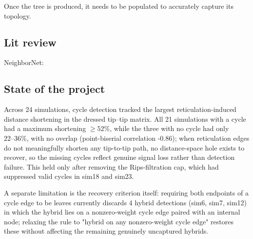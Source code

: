 Once the tree is produced, it needs to be populated to accurately capture its topology. 

\subsection{Lit review}
NeighborNet:

\cite{feged2026shape,bryant2004neighbor}

\subsection{State of the project}
Across 24 simulations, cycle detection tracked the largest reticulation-induced distance shortening in the dressed tip–tip matrix. All 21 simulations with a cycle had a maximum shortening $\geq52\%$, while the three with no cycle had only $22–36\%$, with no overlap (point-biserial correlation -0.86); when reticulation edges do not meaningfully shorten any tip-to-tip path, no distance-space hole exists to recover, so the missing cycles reflect genuine signal loss rather than detection failure. This held only after removing the Rips-filtration cap, which had suppressed valid cycles in sim18 and sim23. 

A separate limitation is the recovery criterion itself: requiring both endpoints of a cycle edge to be leaves currently discards 4 hybrid detections (sim6, sim7, sim12) in which the hybrid lies on a nonzero-weight cycle edge paired with an internal node; relaxing the rule to "hybrid on any nonzero-weight cycle edge" restores these without affecting the remaining genuinely uncaptured hybrids.

